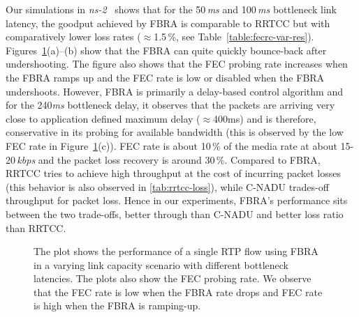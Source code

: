 Our simulations in \emph{ns-2}~\cite{ns2} shows that for the 50\,\emph{ms} and
100\,\emph{ms} bottleneck link latency, the goodput achieved by FBRA is
comparable to RRTCC but with comparatively lower loss rates ($\approx$1.5\,\%,
see Table~\ref{table:fecrc-var-res}). Figures~\ref{fig:fecrc-var}(a)--(b) show
that the FBRA can quite quickly bounce-back after undershooting. The figure
also shows that the FEC probing rate increases when the FBRA ramps up and the
FEC rate is low or disabled when the FBRA undershoots. However, FBRA is
primarily a delay-based control algorithm and for the 240\emph{ms} bottleneck
delay, it observes that the packets are arriving very close to application
defined maximum delay ($\approx$400ms) and is therefore, conservative in its
probing for available bandwidth (this is observed by the low FEC rate in
Figure~\ref{fig:fecrc-var}(c)). FEC rate is about 10\,\% of the media rate at
about 15-20\,\emph{kbps} and the packet loss recovery is around 30\,\%.
Compared to FBRA, RRTCC tries to achieve high throughput at the cost of
incurring packet losses (this behavior is also observed in
\ref{tab:rrtcc-loss}), while C-NADU trades-off throughput for packet loss.
Hence in our experiments, FBRA's performance sits between the two trade-offs,
better through than C-NADU and better loss ratio than RRTCC.



\begin{figure}
  \centerline{
}
\caption{The plot shows the performance of a single RTP flow using FBRA in a
varying link capacity scenario with different bottleneck latencies. The plots
also show the FEC probing rate. We observe that the FEC rate is low when the
FBRA rate drops and FEC rate is high when the FBRA is ramping-up.}
\label{fig:fecrc-var}
\end{figure}

